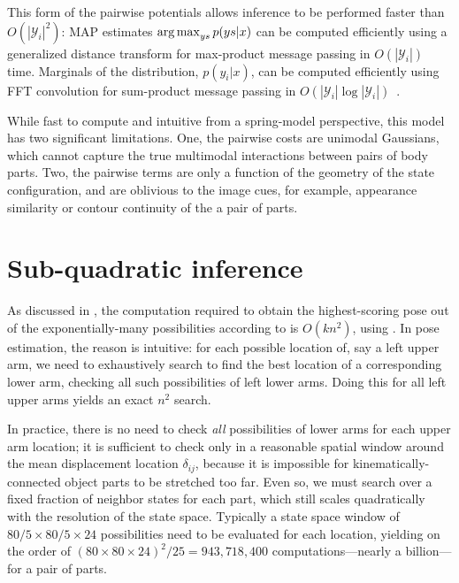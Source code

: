 {This form of the pairwise potentials allows inference to be performed faster than $O(|\mathcal{Y}_i|^2)$:  MAP estimates $\mathop{\arg\max}_{ys} p(ys | x)$ can be computed efficiently using a generalized distance transform for max-product message passing in $O(|\mathcal{Y}_i|)$ time.  Marginals of the distribution, $p(y_i | x)$, can be computed efficiently using FFT convolution for sum-product message passing in $O(|\mathcal{Y}_i| \log |\mathcal{Y}_i|)$~\cite{felz05}.

While fast to compute and intuitive from a spring-model perspective, this model has two significant limitations.  One, the pairwise costs are unimodal Gaussians, which cannot capture the true multimodal interactions between pairs of body parts.  Two, the pairwise terms are only a function of the geometry of the state configuration, and are oblivious to the image cues, for example, appearance similarity or contour continuity of the a pair of parts.
}

\section{Sub-quadratic inference}\label{sec:dt}

As discussed in , the computation required to obtain the 
highest-scoring pose out of the exponentially-many possibilities according to 
 is $O(kn^2)$, using .  In pose 
estimation, the reason is intuitive: for each possible location of, say a left 
upper arm, we need to exhaustively search to find the best location of a 
corresponding lower arm, checking all such possibilities of left lower arms.  
Doing this for all left upper arms yields an exact $n^2$ search.

In practice, there is no need to check {\em all} possibilities of lower arms 
for each upper arm location; it is sufficient to check only in a reasonable 
spatial window around the mean displacement location $\delta_{ij}$, because it 
is impossible for kinematically-connected object parts to be stretched too far.  
Even so, we must search over a fixed fraction of neighbor states for each part, 
which still scales quadratically with the resolution of the state space.  
Typically a state space window of $80/5 \times 80/5 \times 24$ possibilities 
need to be evaluated for each location, yielding on the order of $ (80\times 80 
\times 24)^2 / 25 = 943,718,400$ computations---nearly a billion---for a pair 
of parts.

